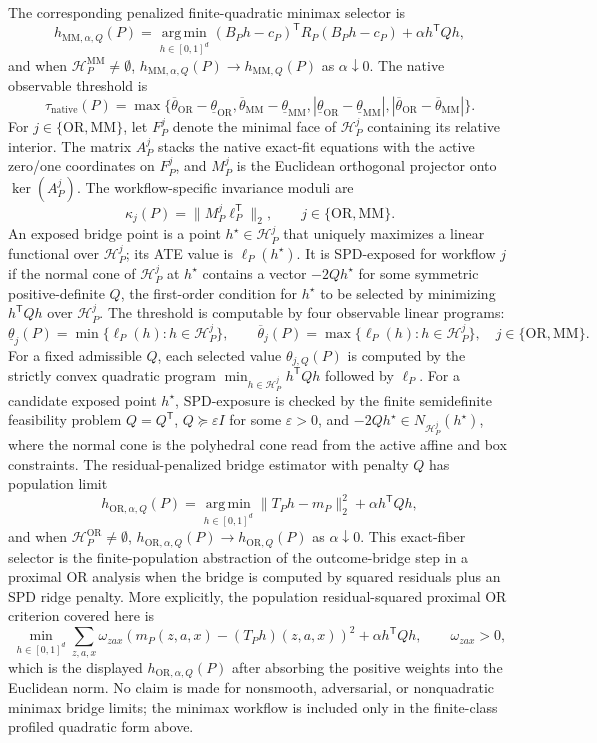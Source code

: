 \documentclass[11pt]{article}
\newcommand{\transpose}{\mathsf{T}}
\newcommand{\calH}{\mathcal{H}}
\theoremstyle{definition}
\theoremstyle{plain}
\theoremstyle{remark}
\begin{document}
The corresponding penalized finite-quadratic minimax selector is
\[
h_{\mathrm{MM},\alpha,Q}(P)=\operatorname*{arg\,min}_{h\in[0,1]^d}
(B_Ph-c_P)^\transpose R_P(B_Ph-c_P)+\alpha h^\transpose Qh,
\]
and when \(\calH_P^{\mathrm{MM}}\neq\emptyset\),
\(h_{\mathrm{MM},\alpha,Q}(P)\to h_{\mathrm{MM},Q}(P)\) as
\(\alpha\downarrow0\).
The native observable threshold is
\[
\tau_{\mathrm{native}}(P)=
\max\{\overline\theta_{\mathrm{OR}}-\underline\theta_{\mathrm{OR}},
\overline\theta_{\mathrm{MM}}-\underline\theta_{\mathrm{MM}},
|\underline\theta_{\mathrm{OR}}-\underline\theta_{\mathrm{MM}}|,
|\overline\theta_{\mathrm{OR}}-\overline\theta_{\mathrm{MM}}|\}.
\]
For \(j\in\{\mathrm{OR},\mathrm{MM}\}\), let \(F_P^j\) denote the minimal
face of \(\calH_P^j\) containing its relative interior.  The matrix \(A_P^j\)
stacks the native exact-fit equations with the active zero/one coordinates
on \(F_P^j\), and \(M_P^j\) is the Euclidean orthogonal projector onto
\(\operatorname{ker}(A_P^j)\).  The workflow-specific invariance moduli are
\[
\kappa_j(P)=\|M_P^j\ell_P^\transpose\|_2,\qquad
j\in\{\mathrm{OR},\mathrm{MM}\}.
\]
An exposed bridge point is a point \(h^\star\in\calH_P^j\) that uniquely
maximizes a linear functional over \(\calH_P^j\); its ATE value is
\(\ell_P(h^\star)\).  It is SPD-exposed for workflow \(j\) if the normal
cone of \(\calH_P^j\) at \(h^\star\) contains a vector \(-2Qh^\star\) for
some symmetric positive-definite \(Q\), the first-order condition for
\(h^\star\) to be selected by minimizing \(h^\transpose Qh\) over
\(\calH_P^j\).
The threshold is computable by four observable linear programs:
\[
\underline\theta_j(P)=\min\{\ell_P(h): h\in\calH_P^j\},\qquad
\overline\theta_j(P)=\max\{\ell_P(h): h\in\calH_P^j\},
\quad j\in\{\mathrm{OR},\mathrm{MM}\}.
\]
For a fixed admissible \(Q\), each selected value
\(\theta_{j,Q}(P)\) is computed by the strictly convex quadratic program
\(\min_{h\in\calH_P^j}h^\transpose Qh\) followed by \(\ell_P\).  For a
candidate exposed point \(h^\star\), SPD-exposure is checked by the finite
semidefinite feasibility problem \(Q=Q^\transpose\), \(Q\succeq\varepsilon I\)
for some \(\varepsilon>0\), and
\(-2Qh^\star\in N_{\calH_P^j}(h^\star)\), where the normal cone is the
polyhedral cone read from the active affine and box constraints.
The residual-penalized bridge estimator with penalty \(Q\) has population
limit
\[
h_{\mathrm{OR},\alpha,Q}(P)=\operatorname*{arg\,min}_{h\in[0,1]^d}
\|T_Ph-m_P\|_2^2+\alpha h^\transpose Qh,
\]
and when \(\calH_P^{\mathrm{OR}}\neq\emptyset\),
\(h_{\mathrm{OR},\alpha,Q}(P)\to h_{\mathrm{OR},Q}(P)\) as
\(\alpha\downarrow0\).
This exact-fiber selector is the finite-population abstraction of the
outcome-bridge step in a proximal OR analysis when the bridge is computed by
squared residuals plus an SPD ridge penalty.
More explicitly, the population residual-squared proximal OR criterion covered
here is
\[
\min_{h\in[0,1]^d}\sum_{z,a,x}\omega_{zax}
\left(m_P(z,a,x)-(T_Ph)(z,a,x)\right)^2+\alpha h^\transpose Qh,
\qquad \omega_{zax}>0,
\]
which is the displayed \(h_{\mathrm{OR},\alpha,Q}(P)\) after absorbing the positive
weights into the Euclidean norm.  No claim is made for nonsmooth,
adversarial, or nonquadratic minimax bridge limits; the minimax workflow is
included only in the finite-class profiled quadratic form above.
\end{document}
